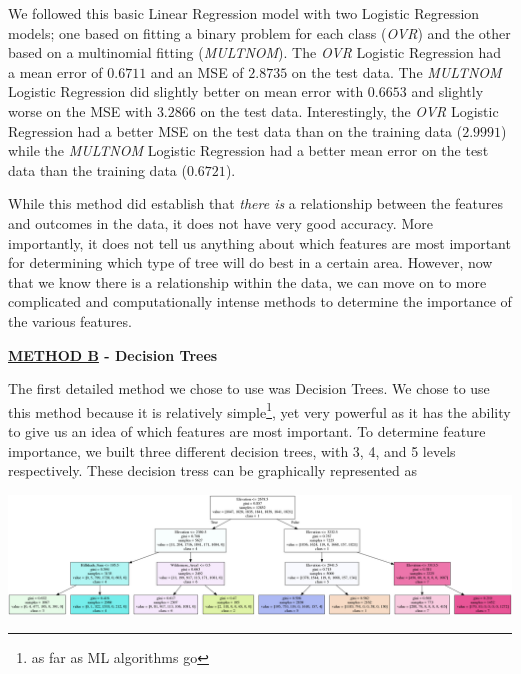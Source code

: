 \documentclass{article}[12pt]
\numberwithin{equation}{subsection}
\begin{document}
\begin{flushleft}
We followed this basic Linear Regression model with two Logistic Regression models; one based on fitting a binary problem for each class (\emph{OVR}) and the other based on a multinomial fitting (\emph{MULTNOM}).  The \emph{OVR} Logistic Regression had a mean error of $0.6711$ and an MSE of $2.8735$ on the test data.  The \emph{MULTNOM} Logistic Regression did slightly better on mean error with $0.6653$ and slightly worse on the MSE with $3.2866$ on the test data.  Interestingly, the \emph{OVR} Logistic Regression had a better MSE on the test data than on the training data ($2.9991$) while the \emph{MULTNOM} Logistic Regression had a better mean error on the test data than the training data ($0.6721$). \newline

While this method did establish that \emph{there is} a relationship between the features and outcomes in the data, it does not have very good accuracy.  More importantly, it does not tell us anything about which features are most important for determining which type of tree will do best in a certain area.  However, now that we know there is a relationship within the data, we can move on to more complicated and computationally intense methods to determine the importance of the various features.


\vspace{1.25in}

\begin{large} \textbf{\underline{METHOD B} - Decision Trees} \end{large}

The first detailed method we chose to use was Decision Trees.  We chose to use this method because it is relatively simple\footnote{as far as ML algorithms go}, yet very powerful as it has the ability to give us an idea of which features are most important.  To determine feature importance, we built three different decision trees, with 3, 4, and 5 levels respectively.  These decision tress can be graphically represented as

\end{flushleft}

\begin{center}
\includegraphics[width=7in]{../decTree1.png}
\end{center}
\end{document}
